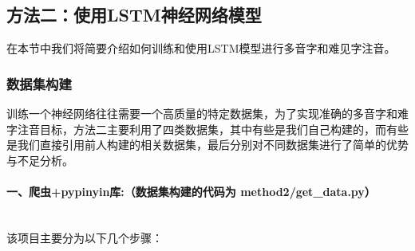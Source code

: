 \documentclass[12pt,hyperref,a4paper,UTF8]{ctexart}
\begin{document}
\subsection{方法二：使用LSTM神经网络模型}
在本节中我们将简要介绍如何训练和使用LSTM模型进行多音字和难见字注音。
\subsubsection{数据集构建}
训练一个神经网络往往需要一个高质量的特定数据集，为了实现准确的多音字和难字注音目标，方法二主要利用了四类数据集，其中有些是我们自己构建的，而有些是我们直接引用前人构建的相关数据集，最后分别对不同数据集进行了简单的优势与不足分析。
\paragraph{一、爬虫+pypinyin库:（数据集构建的代码为 method2/get\_data.py）}\leavevmode\\
\indent 该项目主要分为以下几个步骤：
\end{document}
